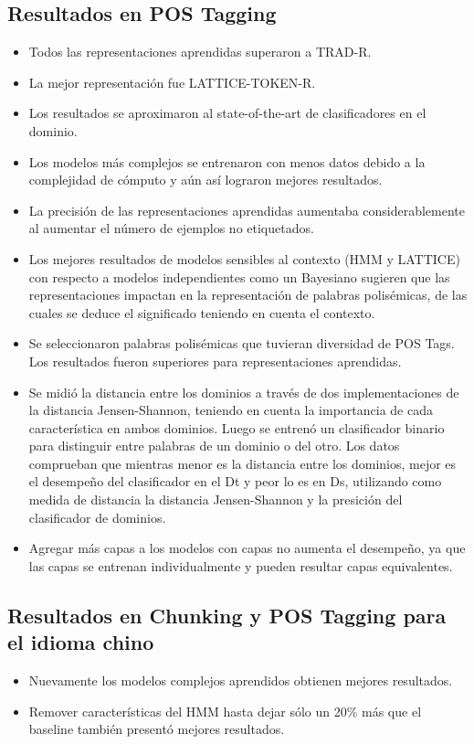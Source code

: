 \documentclass[11pt,spanish]{article}
\begin{document}
\subsection{Resultados en POS Tagging}
\begin{itemize}
    \item Todos las representaciones aprendidas superaron a TRAD-R.
    \item La mejor representación fue LATTICE-TOKEN-R.
    \item Los resultados se aproximaron al state-of-the-art de clasificadores en el dominio.
    \item Los modelos más complejos se entrenaron con menos datos debido a la complejidad de cómputo y aún así lograron mejores resultados.
    \item La precisión de las representaciones aprendidas aumentaba considerablemente al aumentar el número de ejemplos no etiquetados.
    \item Los mejores resultados de modelos sensibles al contexto (HMM y LATTICE) con respecto a modelos independientes como un Bayesiano sugieren que las representaciones impactan en la representación de palabras polisémicas, de las cuales se deduce el significado teniendo en cuenta el contexto.
    \item Se seleccionaron palabras polisémicas que tuvieran diversidad de POS Tags. Los resultados fueron superiores para representaciones aprendidas.
    \item Se midió la distancia entre los dominios a través de dos implementaciones de la distancia Jensen-Shannon, teniendo en cuenta la importancia de cada característica en ambos dominios. Luego se entrenó un clasificador binario para distinguir entre palabras de un dominio o del otro. Los datos comprueban que mientras menor es la distancia entre los dominios, mejor es el desempeño del clasificador en el Dt y peor lo es en Ds, utilizando como medida de distancia la distancia Jensen-Shannon y la presición del clasificador de dominios.
    \item Agregar más capas a los modelos con capas no aumenta el desempeño, ya que las capas se entrenan individualmente y pueden resultar capas equivalentes.
\end{itemize}

\subsection{Resultados en Chunking y POS Tagging para el idioma chino}
\begin{itemize}
    \item Nuevamente los modelos complejos aprendidos obtienen mejores resultados.
    \item Remover características del HMM hasta dejar sólo un 20\% más que el baseline también presentó mejores resultados.
\end{itemize}
\end{document}
